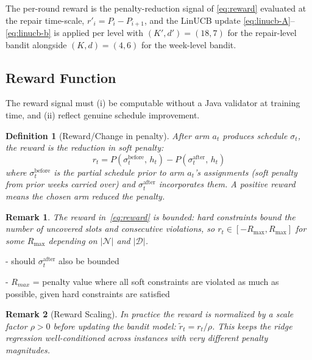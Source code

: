 \documentclass[11pt]{article}
\newtheorem{definition}{Definition}
\newtheorem{remark}{Remark}
\begin{document}
The per-round reward is the penalty-reduction signal of
\eqref{eq:reward} evaluated at the repair time-scale,
$r'_i = P_i - P_{i+1}$, and the LinUCB update
\eqref{eq:linucb-A}--\eqref{eq:linucb-b} is applied per level with
$(K',d') = (18, 7)$ for the repair-level bandit alongside
$(K,d) = (4, 6)$ for the week-level bandit.

\subsection{Reward Function}

The reward signal must (i) be computable without a Java validator at
training time, and (ii) reflect genuine schedule improvement.

\begin{definition}[Reward/Change in penalty]
  After arm $a_t$ produces schedule $\sigma_t$, the reward is the
  \emph{reduction in soft penalty}:
  \begin{equation}
    r_t = P(\sigma_{t}^{\text{before}},\, h_t)
         - P(\sigma_{t}^{\text{after}},\, h_t)
    \label{eq:reward}
  \end{equation}
  where $\sigma_t^{\text{before}}$ is the partial schedule prior to
  arm $a_t$'s assignments (soft penalty from prior weeks carried over)
  and $\sigma_t^{\text{after}}$ incorporates them. A positive reward
  means the chosen arm reduced the penalty.
\end{definition}

\begin{remark}
  The reward in~\eqref{eq:reward} is bounded: hard constraints bound
  the number of uncovered slots and consecutive violations, so
  $r_t \in [-R_{\max}, R_{\max}]$ for some $R_{\max}$ depending on
  $|\mathcal{N}|$ and $|\mathcal{D}|$.
\end{remark}

- should $\sigma_t^{\text{after}}$ also be bounded 

- $R_{max}$ = penalty value where all soft constraints are violated as much as possible, given hard constraints are satisfied 

\begin{remark}[Reward Scaling]
  In practice the reward is normalized by a scale factor
  $\rho > 0$ before updating the bandit model:
  $\tilde{r}_t = r_t / \rho$.
  This keeps the ridge regression well-conditioned across instances
  with very different penalty magnitudes.
\end{remark}
\end{document}
